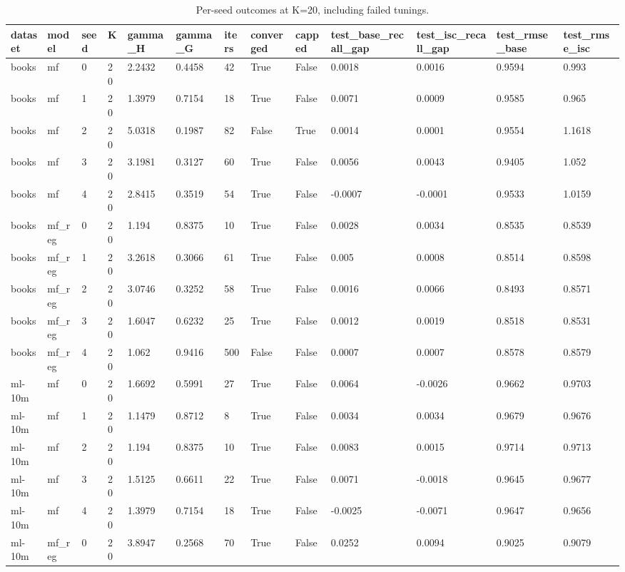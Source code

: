 \begin{table}[h]
\centering
\caption{Per-seed outcomes at K=20, including failed tunings.}
\small
\begin{tabular}{lllllllllllll}
\toprule
dataset & model & seed & K & gamma\_H & gamma\_G & iters & converged & capped & test\_base\_recall\_gap & test\_isc\_recall\_gap & test\_rmse\_base & test\_rmse\_isc \\
\midrule
books & mf & 0 & 20 & 2.2432 & 0.4458 & 42 & True & False & 0.0018 & 0.0016 & 0.9594 & 0.993 \\
books & mf & 1 & 20 & 1.3979 & 0.7154 & 18 & True & False & 0.0071 & 0.0009 & 0.9585 & 0.965 \\
books & mf & 2 & 20 & 5.0318 & 0.1987 & 82 & False & True & 0.0014 & 0.0001 & 0.9554 & 1.1618 \\
books & mf & 3 & 20 & 3.1981 & 0.3127 & 60 & True & False & 0.0056 & 0.0043 & 0.9405 & 1.052 \\
books & mf & 4 & 20 & 2.8415 & 0.3519 & 54 & True & False & -0.0007 & -0.0001 & 0.9533 & 1.0159 \\
books & mf\_reg & 0 & 20 & 1.194 & 0.8375 & 10 & True & False & 0.0028 & 0.0034 & 0.8535 & 0.8539 \\
books & mf\_reg & 1 & 20 & 3.2618 & 0.3066 & 61 & True & False & 0.005 & 0.0008 & 0.8514 & 0.8598 \\
books & mf\_reg & 2 & 20 & 3.0746 & 0.3252 & 58 & True & False & 0.0016 & 0.0066 & 0.8493 & 0.8571 \\
books & mf\_reg & 3 & 20 & 1.6047 & 0.6232 & 25 & True & False & 0.0012 & 0.0019 & 0.8518 & 0.8531 \\
books & mf\_reg & 4 & 20 & 1.062 & 0.9416 & 500 & False & False & 0.0007 & 0.0007 & 0.8578 & 0.8579 \\
ml-10m & mf & 0 & 20 & 1.6692 & 0.5991 & 27 & True & False & 0.0064 & -0.0026 & 0.9662 & 0.9703 \\
ml-10m & mf & 1 & 20 & 1.1479 & 0.8712 & 8 & True & False & 0.0034 & 0.0034 & 0.9679 & 0.9676 \\
ml-10m & mf & 2 & 20 & 1.194 & 0.8375 & 10 & True & False & 0.0083 & 0.0015 & 0.9714 & 0.9713 \\
ml-10m & mf & 3 & 20 & 1.5125 & 0.6611 & 22 & True & False & 0.0071 & -0.0018 & 0.9645 & 0.9677 \\
ml-10m & mf & 4 & 20 & 1.3979 & 0.7154 & 18 & True & False & -0.0025 & -0.0071 & 0.9647 & 0.9656 \\
ml-10m & mf\_reg & 0 & 20 & 3.8947 & 0.2568 & 70 & True & False & 0.0252 & 0.0094 & 0.9025 & 0.9079 \\

\end{tabular}
\end{table}
